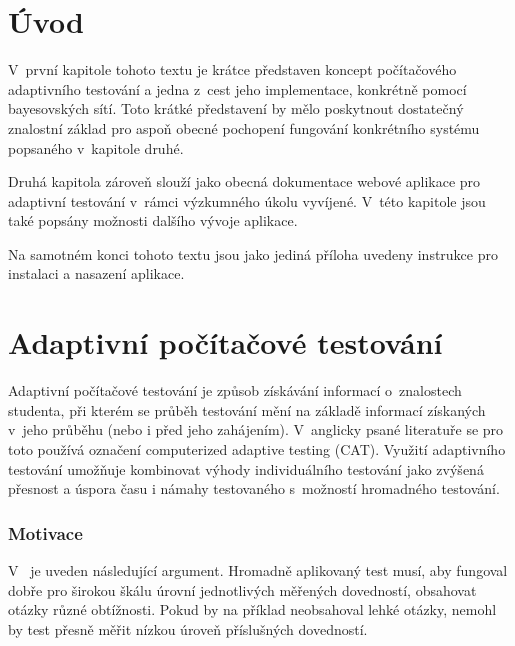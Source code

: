 \documentclass[a4paper,twoside,12pt]{scrbook}
\begin{document}
\chapter*{Úvod} %
%
V~první kapitole tohoto textu je krátce představen koncept počítačového adaptivního testování a jedna z~cest jeho implementace, konkrétně pomocí bayesovských sítí. Toto krátké představení by mělo poskytnout dostatečný znalostní základ pro aspoň obecné pochopení fungování konkrétního systému popsaného v~kapitole druhé.

Druhá kapitola zároveň slouží jako obecná dokumentace webové aplikace pro adaptivní testování v~rámci výzkumného úkolu vyvíjené. V~této kapitole jsou také popsány možnosti dalšího vývoje aplikace.

Na samotném konci tohoto textu jsou jako jediná příloha uvedeny instrukce pro instalaci a nasazení aplikace.
%
%

\chapter{Adaptivní počítačové testování}
Adaptivní počítačové testování je způsob získávání informací o~znalostech studenta, při kterém se průběh testování mění na základě informací získaných v~jeho průběhu (nebo i před jeho zahájením). V~anglicky psané literatuře se pro toto používá označení computerized adaptive testing (CAT). Využití adaptivního testování umožňuje kombinovat výhody individuálního testování jako zvýšená přesnost a úspora času i námahy testovaného s~možností hromadného testování. \cite{almond_tlustospis}%

\subsection{Motivace}
V~\cite[strana~10]{Wainer2000} je uveden následující argument. Hromadně aplikovaný test musí, aby fungoval dobře pro širokou škálu úrovní jednotlivých měřených dovedností, obsahovat otázky různé obtížnosti. Pokud by na příklad neobsahoval lehké otázky, nemohl by test přesně měřit nízkou úroveň příslušných dovedností.
\end{document}
